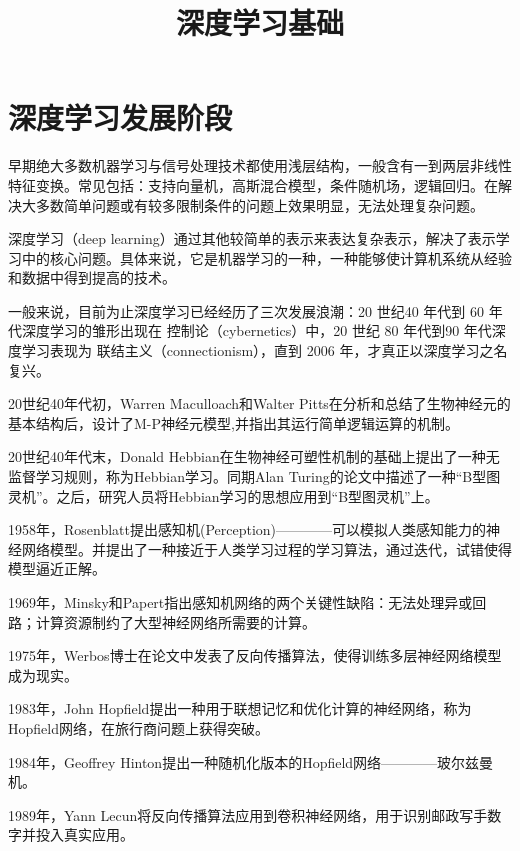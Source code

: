 \documentclass[openbib]{article}
\begin{document}
	\title{深度学习基础}  %
	
	\maketitle
	
	\newpage
	\tableofcontents
	\newpage
	
\section{深度学习发展阶段}
早期绝大多数机器学习与信号处理技术都使用浅层结构，一般含有一到两层非线性特征变换。常见包括：支持向量机，高斯混合模型，条件随机场，逻辑回归。在解决大多数简单问题或有较多限制条件的问题上效果明显，无法处理复杂问题。

深度学习（deep learning）通过其他较简单的表示来表达复杂表示，解决了表示学习中的核心问题。具体来说，它是机器学习的一种，一种能够使计算机系统从经验和数据中得到提高的技术。

一般来说，目前为止深度学习已经经历了三次发展浪潮：20 世纪40 年代到 60 年代深度学习的雏形出现在 控制论（cybernetics）中，20 世纪 80 年代到90 年代深度学习表现为 联结主义（connectionism），直到 2006 年，才真正以深度学习之名复兴。

20世纪40年代初，Warren Maculloach和Walter Pitts在分析和总结了生物神经元的基本结构后，设计了M-P神经元模型,并指出其运行简单逻辑运算的机制。

20世纪40年代末，Donald Hebbian在生物神经可塑性机制的基础上提出了一种无监督学习规则，称为Hebbian学习。同期Alan Turing的论文中描述了一种“B型图灵机”。之后，研究人员将Hebbian学习的思想应用到“B型图灵机”上。

1958年，Rosenblatt提出感知机(Perception)————可以模拟人类感知能力的神经网络模型。并提出了一种接近于人类学习过程的学习算法，通过迭代，试错使得模型逼近正解。

1969年，Minsky和Papert指出感知机网络的两个关键性缺陷：无法处理异或回路；计算资源制约了大型神经网络所需要的计算。

1975年，Werbos博士在论文中发表了反向传播算法，使得训练多层神经网络模型成为现实。

1983年，John Hopfield提出一种用于联想记忆和优化计算的神经网络，称为Hopfield网络，在旅行商问题上获得突破。

1984年，Geoffrey Hinton提出一种随机化版本的Hopfield网络————玻尔兹曼机。

1989年，Yann Lecun将反向传播算法应用到卷积神经网络，用于识别邮政写手数字并投入真实应用。
\end{document}
